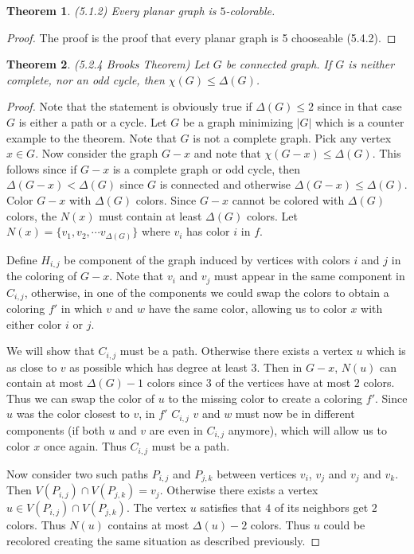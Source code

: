 \documentclass[12pt]{article}
\newtheorem{theorem}{Theorem}
\begin{document}
\begin{theorem} (5.1.2) Every planar graph is $5$-colorable.
\end{theorem}
\begin{proof} The proof is the proof that every planar graph is 5
  chooseable (5.4.2).
\end{proof}

\begin{theorem} (5.2.4 Brooks Theorem) Let $G$ be connected graph. If
  $G$ is neither complete, nor an odd cycle, then
  $\chi(G) \leq \Delta(G)$.
\end{theorem}
\begin{proof} Note that the statement is obviously true if
  $\Delta(G) \leq 2$ since in that case $G$ is either a path or a
  cycle. Let $G$ be a graph minimizing $|G|$ which is a counter
  example to the theorem. Note that $G$ is not a complete graph. Pick
  any vertex $x \in G$. Now consider the graph $G-x$ and note that
  $\chi(G-x) \leq \Delta(G)$. This follows since if $G - x$ is a
  complete graph or odd cycle, then $\Delta(G -x) < \Delta(G)$ since
  $G$ is connected and otherwise $\Delta(G - x) \leq \Delta(G)$. Color
  $G - x$ with $\Delta(G)$ colors. Since $G-x$ cannot be colored with
  $\Delta(G)$ colors, the $N(x)$ must contain at least $\Delta(G)$
  colors. Let $N(x) = \{v_1, v_2, \cdots v_{\Delta(G)} \}$ where $v_i$
  has color $i$ in $f$.

  Define $H_{i,j}$ be component of the graph induced by vertices with
  colors $i$ and $j$ in the coloring of $G - x$. Note that $v_i$ and
  $v_j$ must appear in the same component in $C_{i,j}$, otherwise, in
  one of the components we could swap the colors to obtain a coloring
  $f'$ in which $v$ and $w$ have the same color, allowing us to color
  $x$ with either color $i$ or $j$.

  We will show that $C_{i,j}$ must be a path. Otherwise there exists a
  vertex $u$ which is as close to $v$ as possible which has degree at
  least $3$. Then in $G-x$, $N(u)$ can contain at most $\Delta(G) - 1$
  colors since 3 of the vertices have at most $2$ colors. Thus we can
  swap the color of $u$ to the missing color to create a coloring
  $f'$. Since $u$ was the color closest to $v$, in $f'$ $C_{i,j}$ $v$
  and $w$ must now be in different components (if both $u$ and $v$ are
  even in $C_{i,j}$ anymore), which will allow us to color $x$ once
  again. Thus $C_{i,j}$ must be a path.

  Now consider two such paths $P_{i,j}$ and $P_{j,k}$ between vertices
  $v_i$, $v_j$ and $v_j$ and $v_k$. Then
  $V(P_{i, j}) \cap V(P_{j,k}) = v_j$. Otherwise there exists a vertex
  $u \in V(P_{i, j}) \cap V(P_{j,k})$. The vertex $u$ satisfies that
  $4$ of its neighbors get $2$ colors. Thus $N(u)$ contains at most
  $\Delta(u) - 2$ colors. Thus $u$ could be recolored creating the
  same situation as described previously.


\end{proof}
\end{document}
